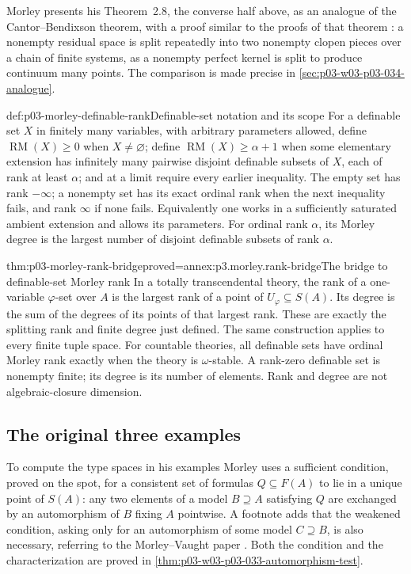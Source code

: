 Morley presents his Theorem~2.8, the converse half above, as an analogue
of the Cantor--Bendixson theorem, with a proof similar to the proofs of
that theorem \cite[p.~522]{Morley1965}: a nonempty residual space is split
repeatedly into two nonempty clopen pieces over a chain of finite systems,
as a nonempty perfect kernel is split to produce continuum many points.
The comparison is made precise in \cref{sec:p03-w03-p03-034-analogue}.

\begin{hbdefinition}{def:p03-morley-definable-rank}{Definable-set notation and its scope}
For a definable set \(X\) in finitely many variables, with arbitrary
parameters allowed, define \(\operatorname{RM}(X)\geq0\) when
\(X\ne\varnothing\); define
\(\operatorname{RM}(X)\geq\alpha+1\) when some elementary extension
has infinitely many pairwise disjoint definable subsets of \(X\),
each of rank at least \(\alpha\); and at a limit require every
earlier inequality. The empty set has rank \(-\infty\); a nonempty
set has its exact ordinal rank when the next inequality fails,
and rank \(\infty\) if none fails. Equivalently one works in a
sufficiently saturated ambient extension and allows its parameters.
For ordinal rank \(\alpha\), its Morley degree is the largest
number of disjoint definable subsets of rank \(\alpha\).
\end{hbdefinition}

\begin{hbtheorem}{thm:p03-morley-rank-bridge}{proved=annex:p3.morley.rank-bridge}{The bridge to definable-set Morley rank}
In a totally transcendental theory, the rank of a one-variable
\(\varphi\)-set over \(A\) is the largest rank of a point of
\(U_\varphi\subseteq S(A)\). Its degree is the sum of the degrees
of its points of that largest rank. These are exactly the splitting
rank and finite degree just defined. The same construction applies
to every finite tuple space. For countable theories, all definable
sets have ordinal Morley rank exactly when the theory is
\(\omega\)-stable. A rank-zero definable set is nonempty finite;
its degree is its number of elements. Rank and degree are not
algebraic-closure dimension.
\end{hbtheorem}

\subsection{The original three examples}
\label{sec:p03-morley-original-examples}

To compute the type spaces in his examples Morley uses a sufficient
condition, proved on the spot, for a consistent set of formulas
\(Q\subseteq F(A)\) to lie in a unique point of \(S(A)\): any two
elements of a model \(B\supseteq A\) satisfying \(Q\) are exchanged by an
automorphism of \(B\) fixing \(A\) pointwise. A footnote adds that the
weakened condition, asking only for an automorphism of some model
\(C\supseteq B\), is also necessary, referring to the Morley--Vaught paper
\cite[p.~523 and n.~14]{Morley1965}. Both the condition and the
characterization are proved in
\cref{thm:p03-w03-p03-033-automorphism-test}.

